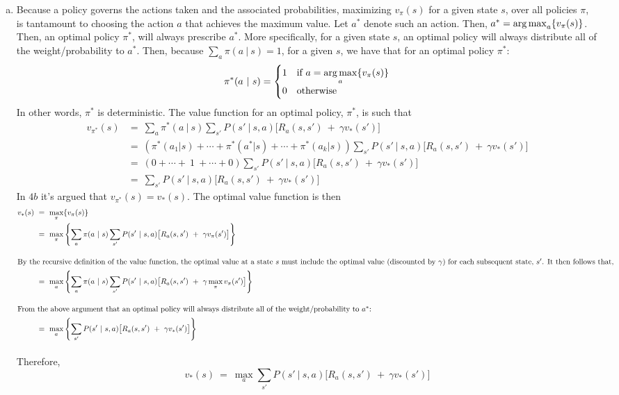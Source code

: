 \documentclass[twoside,11pt]{homework}
\DeclarePairedDelimiter{\2norm}{\lVert}{\rVert^2_2}
\newcommand{\1}[1]{\mathds{1}\left[#1\right]}
\newcommand{\expectpi}{\operatorname{\mathbb{E}_{\pi}}\expectpiarg}
\begin{document}
\begin{enumerate}[(a)]
\item
Because a policy governs the actions taken and the associated probabilities, maximizing $v_{\pi}(s)$ for a given state $s$, over all policies $\pi$, is tantamount to choosing the action $a$ that achieves the maximum value.  Let $a^*$ denote such an action. Then, $a^* = \operatorname*{arg\,max}_a\{v_{\pi}(s)\}$. Then, an optimal policy $\pi^*$, will always prescribe $a^*$. More specifically, for a given state $s$, an optimal policy will always distribute all of the weight/probability to $a^*$. Then, because $\sum_{a} \pi(a \ | \ s) = 1$, for a given $s$, we have that for an optimal policy $\pi^*$: $$\pi^*(a \ | \ s)  = \begin{cases} 1 & \text{if } a = \mathlarger{\argmax_a\{v_{\pi}(s)\}} \\ 0 & \text{otherwise} \end{cases}$$
In other words, $\pi^*$ is deterministic. The value function for an optimal policy, $\pi^*$, is such that 
\begin{align*}
v_{\pi^*}(s) & =  \ \sum_{a}\pi^*(a \ | \ s)\sum_{s'} P(s' \ | \ s, a)\big[R_a(s, s') \ + \ \gamma v_{*}(s') \big]\\
& =  \ \left(\pi^*(a_1 | s) + \cdots + \pi^*(a^* | s) + \cdots + \pi^*(a_k | s)\right)\sum_{s'} P(s' \ | \ s, a)\big[R_a(s, s') \ + \ \gamma v_{*}(s') \big] \\
& = \ \left(0 + \cdots + \ 1 \ + \cdots + 0 \right)\sum_{s'} P(s' \ | \ s, a)\big[R_a(s, s') \ + \ \gamma v_{*}(s') \big]\\
& = \ \sum_{s'} P(s' \ | \ s, a)\big[R_a(s, s') \ + \ \gamma v_{*}(s') \big]
\end{align*}
In $4b$ it's argued that $v_{\pi^*}(s) = v_*(s)$. The optimal value function is then
\begin{align*}
v_*(s) \ & = \ \max_{\pi}\{v_{\pi}(s)\} \\
& = \ \max_{\pi} \left\lbrace \sum_{a} \pi(a \ | \ s)\sum_{s'} P(s' \ | \ s, a)\big[R_a(s, s') \ + \ \gamma v_{\pi}(s') \big]\right\rbrace\\[1em]
\intertext{By the recursive definition of the value function, the optimal value at a state $s$ must include the optimal value (discounted by $\gamma$) for each subsequent state, $s'$. It then follows that,}
& = \ \max_{a} \left\lbrace \sum_{a} \pi(a \ | \ s)\sum_{s'} P(s' \ | \ s, a)\big[R_a(s, s') \ + \ \gamma \max_{\pi} v_{\pi}(s') \big]\right\rbrace\\[1em]
\intertext{From the above argument that an optimal policy will always distribute all of the weight/probability to $a^*$:}
& = \ \max_{a} \left\lbrace \sum_{s'} P(s' \ | \ s, a)\big[R_a(s, s') \ + \ \gamma v_{*}(s') \big]\right\rbrace\\[1em]
\end{align*}
Therefore, $$v_*(s) \ = \ \max_{a} \sum_{s'} P(s' \ | \ s, a)\big[R_a(s, s') \ + \ \gamma v_{*}(s') \big]$$


\end{enumerate}
\end{document}
